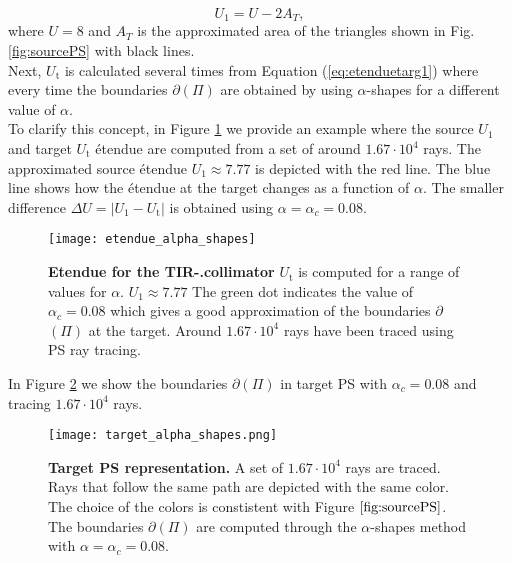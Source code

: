  \begin{equation}\label{eq:Usource}
 U_{1} = U-2A_{T},
 \end{equation}
 where $U=8$ and $A_{T}$ is the approximated area of the triangles shown in Fig. \ref{fig:sourcePS} with black lines.\\ \indent  Next, $U_{\textrm{t}}$ is calculated several times from Equation (\ref{eq:etenduetarg1}) where every time the boundaries $\partial$$(\Pi)$ are obtained by using $\alpha$-shapes for a different value of $\alpha$. 
\\ \indent To clarify this concept, in Figure \ref{fig:etendueTS} we provide an example where the source $U_1$ and target $U_{\textrm{t}}$ \'{e}tendue are computed from a set of around $1.67\cdot 10^4$ rays. The approximated source \'{e}tendue $U_1\approx 7.77$ is depicted with the red line. The blue line shows how the \'{e}tendue at the target changes as a function of $\alpha$. The smaller difference $\Delta U = |U_1-U_{\textrm{t}}|$ is obtained using $\alpha = \alpha_c = 0.08$.
 \begin{figure}[h]
  \begin{center}
  \texttt{[image: etendue\_alpha\_shapes]}
  \end{center}
  \caption{\textbf{Etendue for the TIR-.collimator}
  $U_\textrm{t}$ is computed for a range of values for $\alpha$. $U_1 \approx 7.77$
   The green dot indicates the value of $\alpha_c = 0.08$ which gives a good approximation of the boundaries $\partial$$(\Pi)$ at the target.
   Around $1.67 \cdot 10^4$ rays have been traced using PS ray tracing.
  }
  \label{fig:etendueTS}
\end{figure}
In Figure \ref{fig:targetPS} we show the boundaries 
$\partial$$(\Pi)$ in target PS  with $\alpha_c=0.08$ and tracing $1.67\cdot10^4$ rays.
  \begin{figure}[h]
  \begin{center}
  \texttt{[image: target\_alpha\_shapes.png]}
  \end{center}
  \caption{\textbf{Target PS representation.} A set of $1.67 \cdot 10^4$ rays are traced.
  Rays that follow the same path are depicted with the same color. The choice of the colors is constistent with Figure $\ref{fig:sourcePS}$. The boundaries $\partial$$(\Pi)$ are computed through the $\alpha$-shapes method with $\alpha = \alpha_c = 0.08$.}
  \label{fig:targetPS}
\end{figure}
